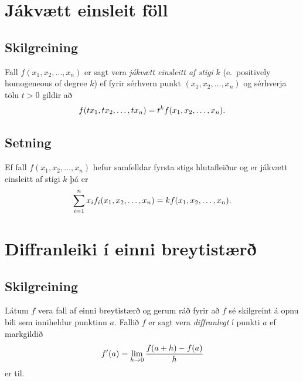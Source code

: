 \documentclass[a4paper,10pt,icelandic]{sphinxmanual}
\begin{document}
\section{Jákvætt einsleit föll}
\label{Kafli2:jakvaett-einsleit-foll}

\subsection{Skilgreining}
\label{Kafli2:index-13}\label{Kafli2:id26}
Fall \(f(x_1, x_2, \ldots, x_n)\) er sagt vera \emph{jákvætt einsleitt af
stigi} \(k\) (e. positively homogeneous of degree \(k\)) ef
fyrir sérhvern punkt \((x_1, x_2, \ldots, x_n)\) og sérhverja tölu
\(t>0\) gildir að
\begin{gather}
\begin{split}\displaystyle f(tx_1, tx_2, \ldots, tx_n)=t^kf(x_1, x_2, \ldots, x_n).\end{split}\notag
\end{gather}

\subsection{Setning}
\label{Kafli2:id27}
Ef fall \(f(x_1, x_2, \ldots, x_n)\) hefur samfelldar fyrsta stigs
hlutafleiður og er jákvætt einsleitt af stigi \(k\) þá er
\begin{gather}
\begin{split}\displaystyle \sum_{i=1}^n x_if_i(x_1, x_2, \ldots, x_n)=kf(x_1, x_2, \ldots, x_n).\end{split}\notag
\end{gather}

\section{Diffranleiki í einni breytistærð}
\label{Kafli2:diffranleiki-i-einni-breytistaer}

\subsection{Skilgreining}
\label{Kafli2:id28}
Látum \(f\) vera fall af einni breytistærð og gerum ráð fyrir að
\(f\) sé skilgreint á opnu bili sem inniheldur punktinn \(a\).
Fallið \(f\) er sagt vera \textit{diffranlegt} í punkti \(a\) ef
markgildið
\begin{gather}
\begin{split}\displaystyle f'(a)=\lim_{h\rightarrow 0}\frac{f(a+h)-f(a)}{h}\end{split}\notag
\end{gather}
er til.
\end{document}
